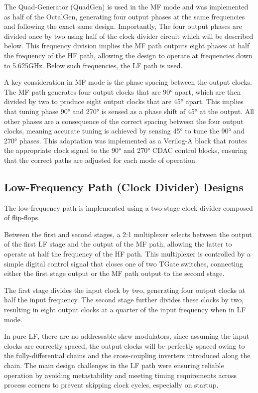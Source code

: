 The Quad-Generator (QuadGen) is used in the MF mode and was implemented as half of the OctalGen, generating four output phases at the same frequencies and following the exact same design. Importantly, The four output phases are divided once by two using half of the clock divider circuit which will be described below. This frequency division implies the MF path outputs eight phases at half the frequency of the HF path, allowing the design to operate at frequencies down to 5.625GHz. Below such frequencies, the LF path is used.

A key consideration in MF mode is the phase spacing between the output clocks. The MF path generates four output clocks that are \ang{90} apart, which are then divided by two to produce eight output clocks that are \ang{45} apart. This implies that tuning phase \ang{90} and \ang{270} is sensed as a phase shift of \ang{45} at the output. All other phases are a consequence of the correct spacing between the four output clocks, meaning accurate tuning is achieved by sensing \ang{45} to tune the \ang{90} and \ang{270} phases. This adaptation was implemented as a Verilog-A block that routes the appropriate clock signal to the \ang{90} and \ang{270} CDAC control blocks, ensuring that the correct paths are adjusted for each mode of operation.

\subsection{Low-Frequency Path (Clock Divider) Designs}

The low-frequency path is implemented using a two-stage clock divider composed of flip-flops.

Between the first and second stages, a 2:1 multiplexer selects between the output of the first LF stage and the output of the MF path, allowing the latter to operate at half the frequency of the HF path. This multiplexer is controlled by a simple digital control signal that closes one of two TGate switches, connecting either the first stage output or the MF path output to the second stage.

The first stage divides the input clock by two, generating four output clocks at half the input frequency. The second stage further divides these clocks by two, resulting in eight output clocks at a quarter of the input frequency when in LF mode.

In pure LF, there are no addressable skew modulators, since assuming the input clocks are correctly spaced, the output clocks will be perfectly spaced owing to the fully-differential chains and the cross-coupling inverters introduced along the chain. The main design challenges in the LF path were ensuring reliable operation by avoiding metastability and meeting timing requirements across process corners to prevent skipping clock cycles, especially on startup.

